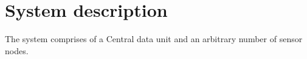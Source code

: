 \chapter{System description}

The system comprises of a Central data unit and an arbitrary number of sensor nodes.

